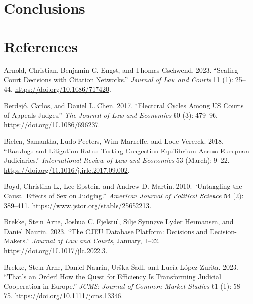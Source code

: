 \documentclass[
  11pt,
]{article}
\newlength{\cslhangindent}
\newenvironment{CSLReferences}[2] %
 {%
  \setlength{\parindent}{0pt}
  \ifodd #1 \everypar{\setlength{\hangindent}{\cslhangindent}}\ignorespaces\fi
  \ifnum #2 > 0
  \setlength{\parskip}{#2\baselineskip}
  \fi
 }%
 {}
\begin{document}
\hypertarget{conclusions}{%
\section{Conclusions}\label{conclusions}}

\vspace{30pt}

\hypertarget{references}{%
\section*{References}\label{references}}

\hypertarget{refs}{}
\begin{CSLReferences}{1}{0}
\leavevmode{}%
Arnold, Christian, Benjamin G. Engst, and Thomas Gschwend. 2023.
{``Scaling {Court Decisions} with {Citation Networks}.''} \emph{Journal
of Law and Courts} 11 (1): 25--44. \url{https://doi.org/10.1086/717420}.

\leavevmode{}%
Berdejó, Carlos, and Daniel L. Chen. 2017. {``Electoral {Cycles} Among
{US Courts} of {Appeals Judges}.''} \emph{The Journal of Law and
Economics} 60 (3): 479--96. \url{https://doi.org/10.1086/696237}.

\leavevmode{}%
Bielen, Samantha, Ludo Peeters, Wim Marneffe, and Lode Vereeck. 2018.
{``Backlogs and Litigation Rates: {Testing} Congestion Equilibrium
Across {European} Judiciaries.''} \emph{International Review of Law and
Economics} 53 (March): 9--22.
\url{https://doi.org/10.1016/j.irle.2017.09.002}.

\leavevmode{}%
Boyd, Christina L., Lee Epstein, and Andrew D. Martin. 2010.
{``Untangling the {Causal Effects} of {Sex} on {Judging}.''}
\emph{American Journal of Political Science} 54 (2): 389--411.
\url{https://www.jstor.org/stable/25652213}.

\leavevmode{}%
Brekke, Stein Arne, Joshua C. Fjelstul, Silje Synnøve Lyder Hermansen,
and Daniel Naurin. 2023. {``The {CJEU Database Platform}: {Decisions}
and {Decision-Makers}.''} \emph{Journal of Law and Courts}, January,
1--22. \url{https://doi.org/10.1017/jlc.2022.3}.

\leavevmode{}%
Brekke, Stein Arne, Daniel Naurin, Urška Šadl, and Lucía López-Zurita.
2023. {``That's an {Order}! {How} the {Quest} for {Efficiency Is
Transforming Judicial Cooperation} in {Europe}.''} \emph{JCMS: Journal
of Common Market Studies} 61 (1): 58--75.
\url{https://doi.org/10.1111/jcms.13346}.


\end{CSLReferences}
\end{document}
